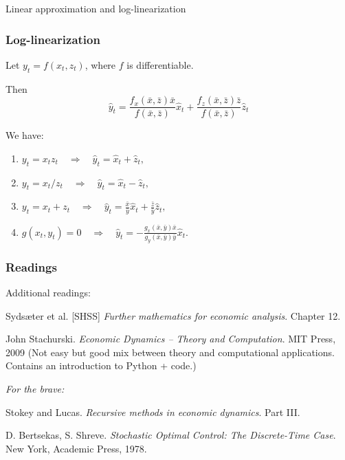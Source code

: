 \documentclass[10pt]{beamer}
\theoremstyle{definition}
\begin{document}
\begin{section}{Linear approximation and log-linearization}
\begin{frame} \frametitle{Log-linearization}
Let $y_t=f(x_t,z_t)$, where $f$ is differentiable. \bigskip

Then $$\hat{y}_t = \frac{f_x(\bar{x},\bar{z})\bar{x}}{f(\bar{x},\bar{z})}\hat{x}_t + \frac{f_z(\bar{x},\bar{z})\bar{z}}{f(\bar{x},\bar{z})}\hat{z}_t$$

We have:

\begin{enumerate}\itemsep1em
  \item $y_t=x_t z_t \quad \Rightarrow \quad \hat{y}_t = \hat{x}_t + \hat{z}_t ,$
  \item $y_t=x_t / z_t \quad \Rightarrow \quad \hat{y}_t = \hat{x}_t - \hat{z}_t ,$
  \item $y_t=x_t + z_t \quad \Rightarrow \quad \hat{y}_t = \frac{\bar{x}}{\bar{y}}\hat{x}_t + \frac{\bar{z}}{\bar{y}}\hat{z}_t ,$
  \item $g(x_t,y_t)=0 \quad \Rightarrow \quad \hat{y}_t = - \frac{g_x(\bar{x},\bar{y})\bar{x}}{g_y(\bar{x},\bar{y})\bar{y}}\hat{x}_t .$
\end{enumerate}
\end{frame}


\end{section}



\begin{frame}[fragile]
\frametitle{Readings}
Additional readings:\bigskip

Syds\ae{}ter et al. [SHSS] \emph{Further mathematics for economic analysis}. Chapter 12.\bigskip

John Stachurski. \emph{Economic Dynamics --  Theory and Computation}. MIT Press, 2009 (Not easy but good mix between theory and computational applications. Contains an introduction to Python + code.)\bigskip

\textit{For the brave:}

Stokey and Lucas. \emph{Recursive methods in economic dynamics}. Part III.\bigskip

D. Bertsekas, S. Shreve. \emph{Stochastic Optimal Control: The Discrete-Time Case}. New York, Academic Press, 1978.\bigskip
\end{frame}
\end{document}
